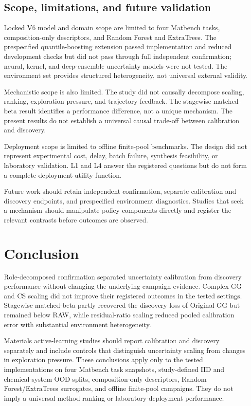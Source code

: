 \documentclass[10pt]{article}
\begin{document}
\subsection{Scope, limitations, and future validation}
Locked V6 model and domain scope are limited to four Matbench tasks,
composition-only descriptors, and Random Forest and ExtraTrees. The
prespecified quantile-boosting extension passed implementation and reduced
development checks but did not pass through full independent confirmation;
neural, kernel, and deep-ensemble uncertainty models were not tested. The environment set provides
structured heterogeneity, not universal external validity.

Mechanistic scope is also limited. The study did not causally decompose
scaling, ranking, exploration pressure, and trajectory feedback. The
stagewise matched-beta result identifies a performance difference, not a
unique mechanism. The present results do not establish a universal causal
trade-off between calibration and discovery.

Deployment scope is limited to offline finite-pool benchmarks. The design did
not represent experimental cost, delay, batch failure, synthesis feasibility,
or laboratory validation. L1 and L4 answer the registered questions but do not
form a complete deployment utility function.

Future work should retain independent confirmation, separate calibration and
discovery endpoints, and prespecified environment diagnostics. Studies that
seek a mechanism should manipulate policy components directly and register the
relevant contrasts before outcomes are observed.

\section{Conclusion}
Role-decomposed confirmation separated uncertainty calibration from discovery
performance without changing the underlying campaign evidence. Complex GG and
CS scaling did not improve their registered outcomes in the tested settings.
Stagewise matched-beta partly recovered the discovery loss of Original GG but
remained below RAW, while residual-ratio scaling reduced pooled calibration
error with substantial environment heterogeneity.

Materials active-learning studies should report calibration and discovery
separately and include controls that distinguish uncertainty scaling from
changes in exploration pressure. These conclusions apply only to the tested
implementations on four Matbench task snapshots, study-defined IID and
chemical-system OOD splits, composition-only descriptors, Random
Forest/ExtraTrees surrogates, and offline finite-pool campaigns. They do not
imply a universal method ranking or laboratory-deployment performance.
\end{document}

